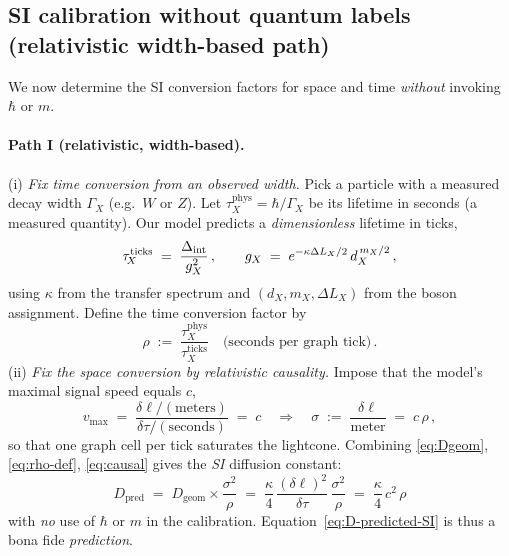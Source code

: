 \documentclass[11pt]{article}
\theoremstyle{plain}
\theoremstyle{definition}
\begin{document}
\subsection{SI calibration without quantum labels (relativistic width-based path)}\label{subsec:calibration-nonQM}

We now determine the SI conversion factors for space and time \emph{without} invoking $\hbar$ or $m$.

\paragraph{Path I (relativistic, width-based).}
(i) \emph{Fix time conversion from an observed width.}
Pick a particle with a measured decay width $\Gamma_{\!X}$ (e.g.\ $W$ or $Z$).
Let $\tau^{\mathrm{phys}}_{\!X} = \hbar/\Gamma_{\!X}$ be its lifetime in seconds (a measured quantity).
Our model predicts a \emph{dimensionless} lifetime in ticks,
\[
  \tau^{\mathrm{ticks}}_{\!X} \;=\; \frac{\Delta_{\rm int}}{g_X^2}\,,
  \qquad g_X \;=\; e^{-\kappa \Delta L_X/2}\, d_X^{\,m_X/2}\,,
\]
using $\kappa$ from the transfer spectrum and $(d_X,m_X,\Delta L_X)$ from the boson assignment.
Define the time conversion factor by
\begin{equation}\label{eq:rho-def}
  \rho \;:=\; \frac{\tau^{\mathrm{phys}}_{\!X}}{\tau^{\mathrm{ticks}}_{\!X}}
  \quad\text{(seconds per graph tick)}\, .
\end{equation}
(ii) \emph{Fix the space conversion by relativistic causality.}
Impose that the model’s maximal signal speed equals $c$,
\begin{equation}\label{eq:causal}
  v_{\max}\;=\;\frac{\delta\ell/\mathrm{(meters)}}{\delta\tau/\mathrm{(seconds)}} \;=\; c
  \quad\Longrightarrow\quad
  \sigma \;:=\; \frac{\delta\ell}{\mathrm{meter}} \;=\; c\,\rho \, ,
\end{equation}
so that one graph cell per tick saturates the lightcone.  Combining \eqref{eq:Dgeom}, \eqref{eq:rho-def}, \eqref{eq:causal} gives the \emph{SI} diffusion constant:
\begin{equation}\label{eq:D-predicted-SI}
  \boxed{\quad D_{\mathrm{pred}} \;=\; D_{\mathrm{geom}}\times \frac{\sigma^2}{\rho}
    \;=\; \frac{\kappa}{4}\,\frac{(\delta\ell)^2}{\delta\tau}\,\frac{\sigma^2}{\rho}
  \;=\; \frac{\kappa}{4}\,c^2\,\rho \quad}
\end{equation}
with \emph{no} use of $\hbar$ or $m$ in the calibration.  Equation~\eqref{eq:D-predicted-SI} is thus a bona fide \emph{prediction}.
\end{document}
